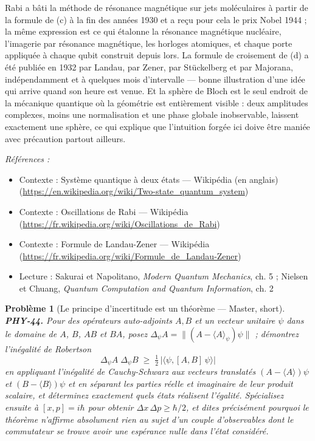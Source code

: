 \documentclass[11pt]{article}
\newtheorem{problem}{Problème}
\newenvironment{refs}{\par\small\noindent\emph{Références :}\begin{itemize}\setlength\itemsep{0pt}}{\end{itemize}\normalsize}
\begin{document}
\noindent Rabi a bâti la méthode de résonance magnétique sur jets moléculaires à partir
de la formule de (c) à la fin des années 1930 et a reçu pour cela le prix Nobel 1944 ; la même
expression est ce qui étalonne la résonance magnétique nucléaire, l'imagerie par résonance
magnétique, les horloges atomiques, et chaque porte appliquée à chaque qubit construit depuis
lors. La formule de croisement de (d) a été publiée en 1932 par Landau, par Zener, par Stückelberg
et par Majorana, indépendamment et à quelques mois d'intervalle --- bonne illustration d'une idée
qui arrive quand son heure est venue. Et la sphère de Bloch est le seul endroit de la mécanique
quantique où la géométrie est entièrement visible : deux amplitudes complexes, moins une
normalisation et une phase globale inobservable, laissent exactement une sphère, ce qui explique
que l'intuition forgée ici doive être maniée avec précaution partout ailleurs.

\begin{refs}
\item Contexte : Système quantique à deux états --- Wikipédia (en anglais) (\url{https://en.wikipedia.org/wiki/Two-state_quantum_system})
\item Contexte : Oscillations de Rabi --- Wikipédia (\url{https://fr.wikipedia.org/wiki/Oscillations_de_Rabi})
\item Contexte : Formule de Landau-Zener --- Wikipédia (\url{https://fr.wikipedia.org/wiki/Formule_de_Landau-Zener})
\item Lecture : Sakurai et Napolitano, \textit{Modern Quantum Mechanics}, ch. 5 ; Nielsen et Chuang, \textit{Quantum Computation and Quantum Information}, ch. 2
\end{refs}

\bigskip

\begin{problem}[{Le principe d'incertitude est un théorème --- Master, short}]
\textbf{PHY-44.} Pour des opérateurs auto-adjoints $A, B$ et un vecteur
unitaire $\psi$ dans le domaine de $A$, $B$, $AB$ et $BA$, posez
$\Delta_\psi A = \lVert (A - \langle A\rangle_\psi)\psi\rVert$ ; démontrez l'inégalité de
Robertson
\[ \Delta_\psi A \; \Delta_\psi B \;\ge\; \tfrac{1}{2}\,\bigl|\langle \psi, [A,B]\,\psi\rangle\bigr| \]
en appliquant l'inégalité de Cauchy-Schwarz aux vecteurs translatés
$(A - \langle A\rangle)\psi$ et $(B - \langle B\rangle)\psi$ et en séparant les parties réelle
et imaginaire de leur produit scalaire, et déterminez exactement quels états réalisent l'égalité.
Spécialisez ensuite à $[x,p] = i\hbar$ pour obtenir $\Delta x\,\Delta p \ge \hbar/2$, et dites
précisément pourquoi le théorème n'affirme absolument rien au sujet d'un couple d'observables dont
le commutateur se trouve avoir une espérance nulle dans l'état considéré.
\end{problem}
\end{document}
